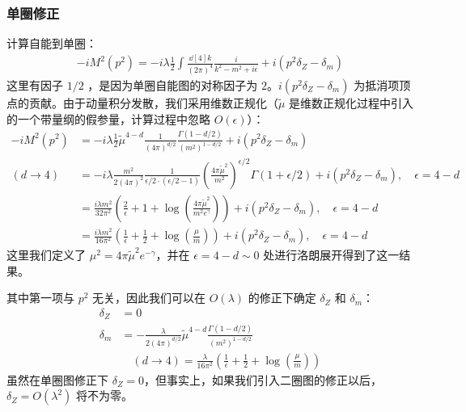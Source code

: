 \subsubsection{单圈修正}
计算自能到单圈：
\begin{equation}
\begin{aligned}
-iM^2(p^2)=-i\lambda \frac{1}{2}\int \frac{\dd[4]{k}}{(2\pi)^4} \frac{i}{k^2-m^2+i\epsilon} + i(p^2\delta_Z-\delta_m)
\end{aligned}
\end{equation}
这里有因子 $1/2$ ，是因为单圈自能图的对称因子为 $2$。$i(p^2\delta_Z-\delta_m)$ 为抵消项顶点的贡献。由于动量积分发散，我们采用维数正规化（$\tilde{\mu}$ 是维数正规化过程中引入的一个带量纲的假参量，计算过程中忽略 $O(\epsilon)$）：
\begin{equation}\label{phi4c1_eq2}
\begin{aligned}
-iM^2(p^2)&=-i\lambda \frac{1}{2} \tilde{\mu}^{4-d}\frac{1}{(4\pi)^{d/2}}\frac{\Gamma(1-d/2)}{(m^2)^{1-d/2}} + i(p^2\delta_Z-\delta_m)\\
(d\rightarrow 4)&= -i\lambda \frac{m^2}{2(4\pi)^2} \frac{1}{\epsilon/2\cdot(\epsilon/2-1)} \left(\frac{4\pi\tilde{\mu}^{2}}{m^2}\right)^{\epsilon/2}\Gamma(1+\epsilon/2) + i(p^2\delta_Z-\delta_m),\quad \epsilon=4-d\\
&=\frac{i\lambda m^2}{32\pi^2}\left(\frac{2}{\epsilon}+1+\log\left(\frac{4\pi\tilde{\mu}^2}{m^2e^{\gamma}}\right) \right)+ i(p^2\delta_Z-\delta_m),\quad \epsilon=4-d\\
&=\frac{i\lambda m^2}{16\pi^2}\left(\frac{1}{\epsilon}+\frac{1}{2}+\log\left(\frac{\mu}{m}\right) \right)+ i(p^2\delta_Z-\delta_m),\quad \epsilon=4-d
\end{aligned}
\end{equation}
这里我们定义了 $\mu^2=4\pi \tilde{\mu}^2 e^{-\gamma}$，并在 $\epsilon=4-d\sim 0$ 处进行洛朗展开得到了这一结果。

其中第一项与 $p^2$ 无关，因此我们可以在 $O(\lambda)$ 的修正下确定 $\delta_Z$ 和 $\delta_m$：
\begin{equation}
\begin{aligned}
\delta_Z &= 0\\
\delta_m &= -\frac{\lambda}{2(4\pi)^{d/2}}\tilde{\mu}^{4-d} \frac{\Gamma(1-d/2)}{(m^2)^{1-d/2}}\\
&\quad (d\rightarrow 4)=\frac{\lambda}{16\pi^2}\left(\frac{1}{\epsilon}+\frac{1}{2}+\log\left(\frac{\mu}{m}\right)\right)
\end{aligned}
\end{equation}
虽然在单圈图修正下 $\delta_Z=0$，但事实上，如果我们引入二圈图的修正以后，$\delta_Z=O(\lambda^2)$ 将不为零。

